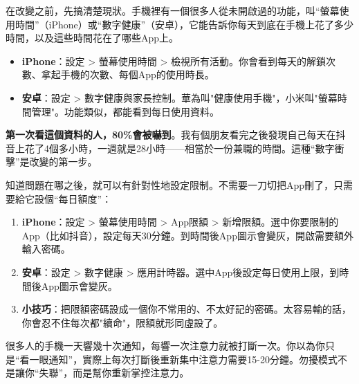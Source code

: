 


在改變之前，先搞清楚現狀。手機裡有一個很多人從未開啟過的功能，叫“螢幕使用時間”（iPhone）或“數字健康”（安卓），它能告訴你每天到底在手機上花了多少時間，以及這些時間花在了哪些App上。

\begin{itemize}
  \item \textbf{iPhone}：設定 > 螢幕使用時間 > 檢視所有活動。你會看到每天的解鎖次數、拿起手機的次數、每個App的使用時長。
  \item \textbf{安卓}：設定 > 數字健康與家長控制。華為叫"健康使用手機"，小米叫"螢幕時間管理"。功能類似，都能看到每日使用資料。
\end{itemize}

\textbf{第一次看這個資料的人，80\%會被嚇到}。我有個朋友看完之後發現自己每天在抖音上花了4個多小時，一週就是28小時——相當於一份兼職的時間。這種“數字衝擊”是改變的第一步。


知道問題在哪之後，就可以有針對性地設定限制。不需要一刀切把App刪了，只需要給它設個“每日額度”：

\begin{enumerate}
  \item \textbf{iPhone}：設定 > 螢幕使用時間 > App限額 > 新增限額。選中你要限制的App（比如抖音），設定每天30分鐘。到時間後App圖示會變灰，開啟需要額外輸入密碼。
  \item \textbf{安卓}：設定 > 數字健康 > 應用計時器。選中App後設定每日使用上限，到時間後App圖示會變灰。
  \item \textbf{小技巧}：把限額密碼設成一個你不常用的、不太好記的密碼。太容易輸的話，你會忍不住每次都"續命"，限額就形同虛設了。
\end{enumerate}


很多人的手機一天響幾十次通知，每響一次注意力就被打斷一次。你以為你只是“看一眼通知”，實際上每次打斷後重新集中注意力需要15-20分鐘。勿擾模式不是讓你“失聯”，而是幫你重新掌控注意力。

